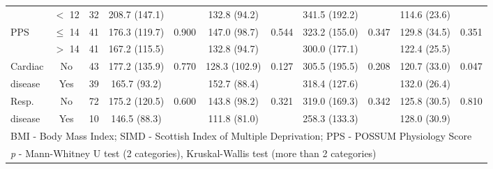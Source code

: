 \begin{sidewaystable}[p]
\begin{tabular}{|l c c | c c| c c | c c | c c|}
		                          & $<$ 12    & 32 & 208.7 (147.1) &                       & 132.8 (94.2)  &                   & 341.5 (192.2) &                & 114.6 (23.6) &  \\
		PPS                       & $\leq$ 14 & 41 & 176.3 (119.7) & 0.900                 & 147.0 (98.7)  & 0.544             & 323.2 (155.0) & 0.347          & 129.8 (34.5) & 0.351                 \\
		                          & $>$ 14    & 41 & 167.2 (115.5) &                       & 132.8 (94.7)  &                   & 300.0 (177.1) &                & 122.4 (25.5) &  \\
		Cardiac                   & No        & 43 & 177.2 (135.9) & 0.770                 & 128.3 (102.9) & 0.127             & 305.5 (195.5) & 0.208          & 120.7 (33.0) & 0.047                 \\
		disease                   & Yes       & 39 & 165.7 (93.2)  &                       & 152.7 (88.4)  &                   & 318.4 (127.6) &                & 132.0 (26.4) &  \\
		Resp.                     & No        & 72 & 175.2 (120.5) & 0.600                 & 143.8 (98.2)  & 0.321             & 319.0 (169.3) & 0.342          & 125.8 (30.5) & 0.810                 \\
		disease                   & Yes       & 10 & 146.5 (88.3)  &                       & 111.8 (81.0)  &                   & 258.3 (133.3) &                & 128.0 (30.9) &  \\ \hline
		\multicolumn{11}{l}{BMI - Body Mass Index; SIMD - Scottish Index of Multiple Deprivation; PPS - POSSUM Physiology Score}                                                                       \\
		\multicolumn{11}{l}{\textit{p} - Mann-Whitney U test (2 categories), Kruskal-Wallis test (more than 2 categories)}
	\end{tabular}
\end{sidewaystable}



























